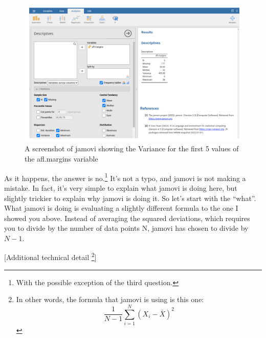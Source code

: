 \documentclass[
]{book}
\begin{document}
\begin{figure}
\includegraphics[width=0.9\linewidth]{images/Figure16} \caption{A screenshot of jamovi showing the Variance for the first 5 values of the afl.margins variable}\label{fig:fig4-9}
\end{figure}

As it happens, the answer is no.\footnote{With the possible exception of the third question.} It's not a typo, and jamovi is not making a mistake. In fact, it's very simple to explain what jamovi is doing here, but slightly trickier to explain why jamovi is doing it. So let's start with the ``what''. What jamovi is doing is evaluating a slightly different formula to the one I showed you above. Instead of averaging the squared deviations, which requires you to divide by the number of data points N, jamovi has chosen to divide by \(N - 1\).

{{[}Additional technical detail \footnote{In other words, the formula that jamovi is using is this one: \[\frac{1}{N-1} \sum_{i=1}^{N} ( X_i - \bar{X} )^2\]}{]}}
\end{document}
